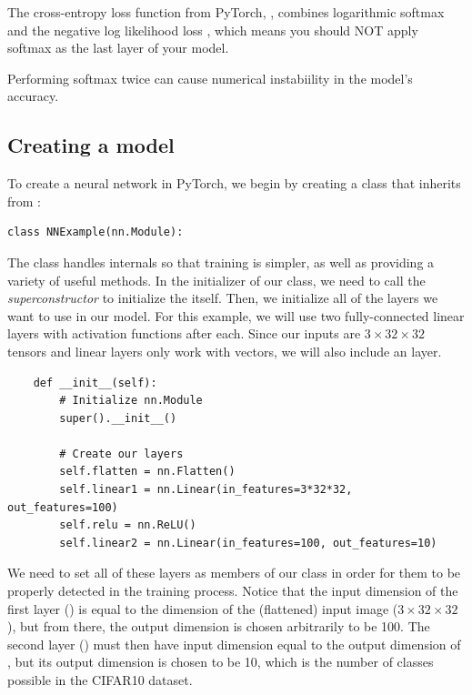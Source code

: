 \begin{warn}
    The cross-entropy loss function from PyTorch, , combines logarithmic softmax  and the negative log likelihood loss , 
    which means you should NOT apply softmax as the last layer of your model.
    
    Performing softmax twice can cause numerical instabiility in the model's accuracy.
\end{warn}

\subsection*{Creating a model}
To create a neural network in PyTorch, we begin by creating a class that inherits from :
\begin{lstlisting}
class NNExample(nn.Module):
\end{lstlisting}
The class  handles internals so that training is simpler, as well as providing a variety of useful methods.
In the initializer of our class, we need to call the \emph{superconstructor}  to initialize the  itself.
Then, we initialize all of the layers we want to use in our model.
For this example, we will use two fully-connected linear layers with activation functions after each.
Since our inputs are \(3\times32\times32\) tensors and linear layers only work with vectors, we will also include an  layer.
\begin{lstlisting}
    def __init__(self):
        # Initialize nn.Module
        super().__init__()
        
        # Create our layers
        self.flatten = nn.Flatten()
        self.linear1 = nn.Linear(in_features=3*32*32, out_features=100)
        self.relu = nn.ReLU()
        self.linear2 = nn.Linear(in_features=100, out_features=10)
\end{lstlisting}
We need to set all of these layers as members of our class in order for them to be properly detected in the training process.
Notice that the input dimension of the first layer () is equal to the dimension of the (flattened) input image ($3\times32\times32$), but from there, the output dimension is chosen arbitrarily to be 100.
The second layer () must then have input dimension equal to the output dimension of , but its output dimension is chosen to be 10, which is the number of classes possible in the CIFAR10 dataset.

